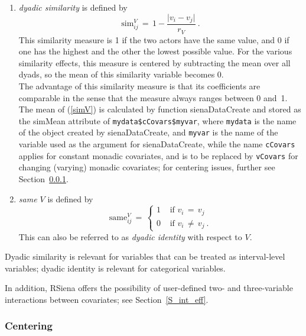 \documentclass[a4paper,fleqn,11pt]{article}
\newcommand{\+}{\, + \,}
\newcommand{\sfn}[1]{\textsf{#1}}
\newcommand{\RS}{{\sf \textsf{RSiena} }}
\begin{document}
\begin{enumerate}
\item \emph{dyadic similarity} is defined by
\begin{equation}
 \text{sim}^V_{ij} \,=\, 1 - \frac{ \vert v_i - v_j \vert }{ r_V } \ .
            \label{simV}
\end{equation}
      This similarity measure is 1 if
      the two actors have the same value, and 0 if one has the highest and the
      other the lowest possible value.
      For the various similarity effects, this measure
      is centered by subtracting the mean over all dyads,
      so the mean of this similarity variable becomes 0.    \\
      The advantage of this similarity measure is that its coefficients
      are comparable in the sense that the measure always ranges
      between 0 and~1.  \\
      The mean of (\ref{simV}) is calculated by function
      \textsf{sienaDataCreate} and stored as the \sfn{simMean} attribute
      of \texttt{mydata\$cCovars\$myvar}, where \texttt{mydata} is the name
      of the object created by \textsf{sienaDataCreate}, and \texttt{myvar}
      is the name of the variable used as the argument for
      \textsf{sienaDataCreate}, while the name \texttt{cCovars} applies for
      constant monadic covariates, and is to be replaced by \texttt{vCovars}
      for changing (varying) monadic covariates;
      for centering issues, further see Section~\ref{S_center}.
\item \emph{same $V$} is defined by
\begin{equation}
 \text{same}^V_{ij} \,=\,
        \left\{ \begin{array}{ll} 1 & \text{ if } v_i \,=\, v_j \\
                          0 & \text{ if } v_i \,\neq\, v_j \ .
    \end{array} \right.
\end{equation}
      This can also be referred to as \emph{dyadic identity}
      with respect to $V$.
\end{enumerate}
Dyadic similarity is relevant for variables that can be treated as
interval-level variables; dyadic identity is relevant for categorical variables.

In addition, \RS offers the possibility of user-defined two- and three-variable
interactions between covariates; see Section~\ref{S_int_eff}.


\subsubsection{Centering}
\label{S_center}
\end{document}
